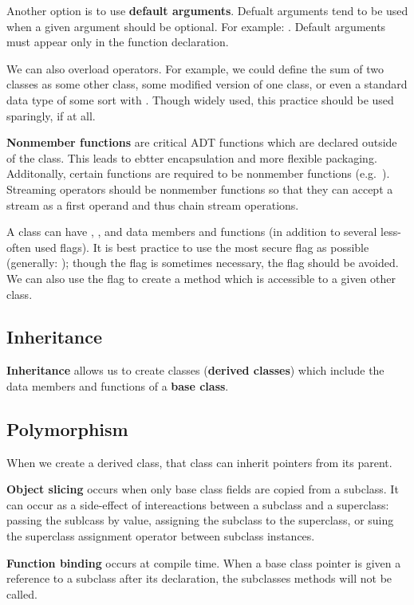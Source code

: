 \documentclass[12pt]{article}
\begin{document}
Another option is to use {\bf default arguments}. Defualt arguments tend to be used when a given argument should be optional. For example: . Default arguments must appear only in the function declaration.

We can also overload operators. For example, we could define the sum of two classes as some other class, some modified version of one class, or even a standard data type of some sort with . Though widely used, this practice should be used sparingly, if at all.

{\bf Nonmember functions} are critical ADT functions which are declared outside of the class. This leads to ebtter encapsulation and more flexible packaging. Additonally, certain functions are required to be nonmember functions (e.g.\ ). Streaming operators should be nonmember functions so that they can accept a stream as a first operand and thus chain stream operations.

A class can have , , and  data members and functions (in addition to several less-often used flags). It is best practice to use the most secure flag as possible (generally: ); though the  flag is sometimes necessary, the  flag should be avoided. We can also use the  flag to create a  method which is accessible to a given other class.

\subsection{Inheritance}
{\bf Inheritance} allows us to create classes ({\bf derived classes}) which include the data members and functions of a {\bf base class}.

\subsection{Polymorphism}
When we create a derived class, that class can inherit pointers from its parent.

{\bf Object slicing} occurs when only base class fields are copied from a subclass. It can occur as a side-effect of intereactions between a subclass and a superclass: passing the sublcass by value, assigning the subclass to the superclass, or suing the superclass assignment operator between subclass instances.

{\bf Function binding} occurs at compile time. When a base class pointer is given a reference to a subclass after its declaration, the subclasses methods will not be called.
\end{document}
